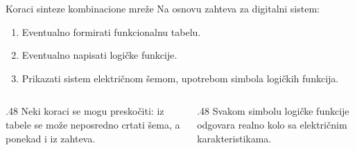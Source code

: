 \begin{frame}[label=02-s010]{Koraci sinteze kombinacione mreže}
Na osnovu zahteva za digitalni sistem:
\par\vspace{2mm}
\begin{enumerate}
\item Eventualno formirati funkcionalnu tabelu.
\item Eventualno napisati logičke funkcije.
\item Prikazati sistem električnom šemom, upotrebom simbola logičkih funkcija.
\end{enumerate}
\par\vspace{4mm}
\begin{columns}[T,onlytextwidth]
\begin{column}{.48\textwidth}
\vspace{2mm}
Neki koraci se mogu preskočiti: iz tabele se može neposredno crtati šema, a ponekad i iz zahteva.
\end{column}
\begin{column}{.48\textwidth}
\vspace{2mm}
Svakom simbolu logičke funkcije odgovara realno kolo sa električnim karakteristikama.
\end{column}
\end{columns}
\par\vspace{4mm}
\end{frame}
